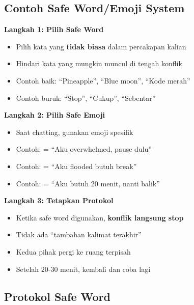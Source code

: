 \subsection{Contoh Safe Word/Emoji System}

\begin{exercisebox}
\textbf{Langkah 1: Pilih Safe Word}
\begin{itemize}
    \item Pilih kata yang \textbf{tidak biasa} dalam percakapan kalian
    \item Hindari kata yang mungkin muncul di tengah konflik
    \item Contoh baik: ``Pineapple'', ``Blue moon'', ``Kode merah''
    \item Contoh buruk: ``Stop'', ``Cukup'', ``Sebentar''
\end{itemize}

\textbf{Langkah 2: Pilih Safe Emoji}
\begin{itemize}
    \item Saat chatting, gunakan emoji spesifik
    \item Contoh: \emoji{\faPause} = ``Aku overwhelmed, pause dulu''
    \item Contoh: \emoji{\faLifeRing} = ``Aku flooded butuh break''
    \item Contoh: \emoji{\faClock} = ``Aku butuh 20 menit, nanti balik''
\end{itemize}

\textbf{Langkah 3: Tetapkan Protokol}
\begin{itemize}
    \item Ketika safe word digunakan, \textbf{konflik langsung stop}
    \item Tidak ada ``tambahan kalimat terakhir''
    \item Kedua pihak pergi ke ruang terpisah
    \item Setelah 20-30 menit, kembali dan coba lagi
\end{itemize}
\end{exercisebox}

\subsection{Protokol Safe Word}

